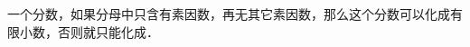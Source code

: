 
一个\key{\hspace{4em}}分数，如果分母中只含有素因数\key{\hspace{4em}}，再无其它素因数，那么这个分数可以化成有限小数，否则就只能化成\key{\hspace{4em}}．

